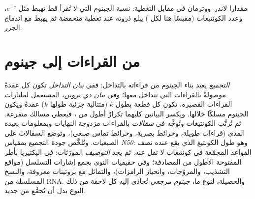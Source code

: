\begin{omfigure}

{\small مقدارا لاندر--ووترمان في مقابل التغطية: نسبة الجينوم التي لا
تُقرأ قط تهبط مثل $e^{-c}$، وعدد الكونتيغات (مقيسًا هنا لكل )
يبلغ ذروته عند تغطية منخفضة ثم يهبط مع اندماج
الجزر.}
\end{omfigure}

\section{من القراءات إلى جينوم}

\begin{definition}\label{def:b3:genomics:assembly}
\emph{التجميع} يعيد بناء الجينوم من قراءاته بالتداخل: ففي
\emph{بيان التداخل} تكون كل  عقدةً موصولةً بالقراءات التي
تتداخل معها؛ وفي \emph{بيان دي بروين}، المستعمل لمليارات القراءات
القصيرة، تكون كل قطعة بطول $k$ (متتالية جزئية طولها $k$) عقدةً ويكون
الجينوم مسلكًا خلالها. ويكسر البيانين كليهما تكرارٌ أطول من
، فيعطي مسالك متفرعة. ثم تُرتَّب الكونتيغات وتُوجَّه
في \emph{سقالات} بالقراءات مزدوجة النهايات وبمعلومات بعيدة المدى
(قراءات طويلة، وخرائط بصرية، وخرائط تماس صبغي)، وتوضع
السقالات على الصبغيات. وتُلخَّص جودة التجميع بمقياس
\emph{N50}: وهو طول الكونتيغ الذي يقع عنده نصف القواعد المجمّعة
في كونتيغات لا تقل عنه. ثم يجد \emph{التوصيف}
المورّثات: في البكتيريا بأطر  المفتوحة الأطول من المصادفة؛ وفي
حقيقيات النوى بجمع إشارات التسلسل (مواقع التشذيب، والمروّجات،
وانحياز الرامزات)، والتماثل مع بروتينات معروفة، والنسخ المسلسلة
من RNA. والحصيلة، لنوع ما، \emph{جينوم مرجعي} تُحاذى
إليه كل  لاحقة من ذلك النوع بدل أن تُجمَّع من
جديد.
\end{definition}

